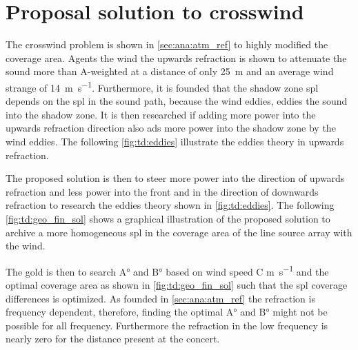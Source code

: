 \section{Proposal solution to crosswind}\label{sec:des:pro_cross}
The crosswind problem is shown in \autoref{sec:ana:atm_ref} to highly modified the coverage area. Agents the wind the upwards refraction is shown to attenuate the sound more than  A-weighted at a distance of only \SI{25}{\meter} and an average wind strange of \SI{14}{\meter\per\second}. Furthermore, it is founded that the shadow zone \gls{spl} depends on the \gls{spl} in the sound path, because the wind eddies, eddies the sound into the shadow zone. It is then researched if adding more power into the upwards refraction direction also ads more power into the shadow zone by the wind eddies. The following \autoref{fig:td:eddies} illustrate the eddies theory in upwards refraction.


The proposed solution is then to steer more power into the direction of upwards refraction and less power into the front and in the direction of downwards refraction to research the eddies theory shown in \autoref{fig:td:eddies}. The following \autoref{fig:td:geo_fin_sol} shows a graphical illustration of the proposed solution to archive a more homogeneous \gls{spl} in the coverage area of the line source array with the wind.


The gold is then to search A\si{\degree} and B\si{\degree} based on wind speed C \si{\meter\per\second} and the optimal coverage area as shown in \autoref{fig:td:geo_fin_sol} such that the \gls{spl} coverage differences is optimized. As founded in \autoref{sec:ana:atm_ref} the refraction is frequency dependent, therefore, finding the optimal  A\si{\degree} and B\si{\degree} might not be possible for all frequency. Furthermore the refraction in the low frequency is nearly zero for the distance present at the concert. 




